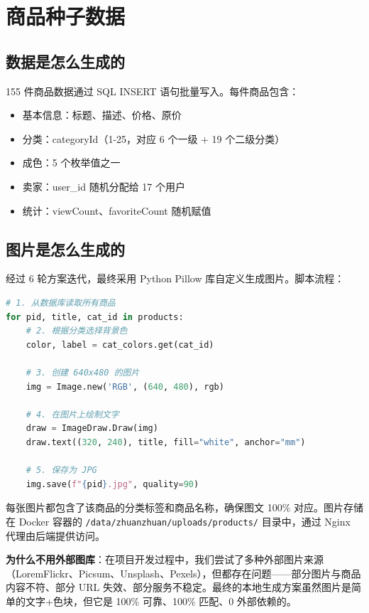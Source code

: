 \documentclass[12pt,a4paper]{ctexart}
\begin{document}
\section{商品种子数据}

\subsection{数据是怎么生成的}

155 件商品数据通过 SQL INSERT 语句批量写入。每件商品包含：
\begin{itemize}
  \item 基本信息：标题、描述、价格、原价
  \item 分类：categoryId（1-25，对应 6 个一级 + 19 个二级分类）
  \item 成色：5 个枚举值之一
  \item 卖家：user\_id 随机分配给 17 个用户
  \item 统计：viewCount、favoriteCount 随机赋值
\end{itemize}

\subsection{图片是怎么生成的}

经过 6 轮方案迭代，最终采用 Python Pillow 库自定义生成图片。脚本流程：

\begin{lstlisting}[language=Python]
# 1. 从数据库读取所有商品
for pid, title, cat_id in products:
    # 2. 根据分类选择背景色
    color, label = cat_colors.get(cat_id)

    # 3. 创建 640x480 的图片
    img = Image.new('RGB', (640, 480), rgb)

    # 4. 在图片上绘制文字
    draw = ImageDraw.Draw(img)
    draw.text((320, 240), title, fill="white", anchor="mm")

    # 5. 保存为 JPG
    img.save(f"{pid}.jpg", quality=90)
\end{lstlisting}

每张图片都包含了该商品的分类标签和商品名称，确保图文 100\% 对应。图片存储在 Docker 容器的 \texttt{/data/zhuanzhuan/uploads/products/} 目录中，通过 Nginx 代理由后端提供访问。

\textbf{为什么不用外部图库}：在项目开发过程中，我们尝试了多种外部图片来源（LoremFlickr、Picsum、Unsplash、Pexels），但都存在问题——部分图片与商品内容不符、部分 URL 失效、部分服务不稳定。最终的本地生成方案虽然图片是简单的文字+色块，但它是 100\% 可靠、100\% 匹配、0 外部依赖的。
\end{document}
